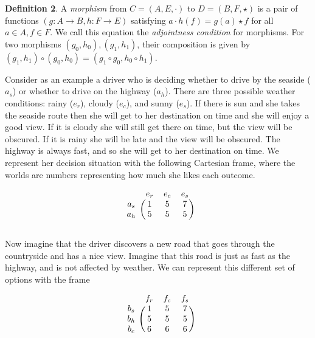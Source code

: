\documentclass{article}
\begin{document}
\bigskip
\noindent \textbf{Definition 2}.
A \emph{morphism} from $C = (A, E, \cdot)$ to $D = (B, F, \star)$ is a pair of functions $(g: A \to B, h: F \to E)$ satisfying $a \cdot h(f) = g(a) \star f$ for all $a \in A, f \in F$.
We call this equation the \emph{adjointness condition} for morphisms.
For two morphisms $(g_0, h_0), (g_1, h_1)$, their composition is given by $(g_1, h_1) \circ (g_0, h_0) = (g_1 \circ g_0, h_0 \circ h_1)$.

\bigskip


Consider as an example a driver who is deciding whether to drive by the seaside ($a_{s}$) or whether to drive on the highway ($a_{h}$). There are three possible weather conditions: rainy ($e_{r}$), cloudy ($e_{c}$), and sunny ($e_{s}$). If there is sun and she takes the seaside route then she will get to her destination on time and she will enjoy a good view. If it is cloudy she will still get there on time, but the view will be obscured. If it is rainy she will be late and the view will be obscured. The highway is always fast, and so she will get to her destination on time. We represent her decision situation with the following Cartesian frame, where the worlds are numbers representing how much she likes each outcome. 


\bigskip
\[
\begin{blockarray}{cccc}
& e_r & e_c & e_s\\
\begin{block}{c(ccc)}
a_s & 1 & 5 & 7\\
a_h & 5 & 5 & 5\\
\end{block}
\end{blockarray}
\]

Now imagine that the driver discovers a new road that goes through the countryside and has a nice view. Imagine that this road is just as fast as the highway, and is not affected by weather. We can represent this different set of options with the frame

\bigskip
\[
\begin{blockarray}{cccc}
& f_r & f_c & f_s\\
\begin{block}{c(ccc)}
b_s & 1 & 5 & 7\\
b_h & 5 & 5 & 5\\
b_c & 6 & 6 & 6\\
\end{block}
\end{blockarray}
\]
\end{document}
